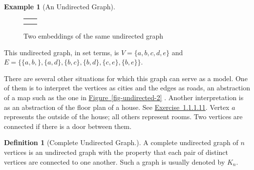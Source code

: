 \documentclass[10pt,]{book}
\theoremstyle{plain}
\theoremstyle{definition}
\newtheorem{definition}[theorem]{Definition}
\theoremstyle{definition}
\theoremstyle{definition}
\newtheorem{example}[theorem]{Example}
\theoremstyle{definition}
\theoremstyle{definition}
\numberwithin{equation}{section}
\newlength{\panelmax}
\begin{document}
\begin{example}[An Undirected Graph]
{\settototalheight{\phDimage}{\usebox{\panelboxDimage}}
\setlength{\panelmax}{\maxof{\panelmax}{\phDimage}}
\leavevmode%
\setlength{\tabcolsep}{0\textwidth}
\begin{figure}
\begin{tabular}{@{}*{2}{c}@{}}
\begin{minipage}[c][\panelmax][t]{0.5\textwidth}\usebox{\panelboxCimage}\end{minipage}&
\begin{minipage}[c][\panelmax][t]{0.5\textwidth}\usebox{\panelboxDimage}\end{minipage}\tabularnewline
\parbox[t]{0.5\textwidth}{\subcaption{\label{fig-undirected-1}}
}&
\parbox[t]{0.5\textwidth}{\subcaption{\label{fig-undirected-2}}
}\end{tabular}
\caption{Two embeddings of the same undirected graph\label{fig-sidebyside-9-1}}
\end{figure}
}%
\par
This undirected graph, in set terms,  is \(V = \{a, b, c, d, e\}\) and \(E = \{\{a, b,\}, \{a, d\}, \{b, c\}, \{b, d\}, \{c, e\}, \{b, e\}\}\).%
\par
There are several other situations for which this graph can serve as a model. One of them is to interpret the vertices as cities and the edges as roads, an abstraction of a map such as the one in \hyperref[fig-undirected-2]{Figure~\ref{fig-undirected-2}} . Another interpretation is as an abstraction of the floor plan of a house.  See \hyperlink{exercise-house-9-1}{Exercise~1.1.1.11}. Vertex \(a\) represents the outside of the house; all others represent rooms. Two vertices are connected if there is a door between
them. %
\end{example}
\begin{definition}[Complete Undirected Graph.]\label{def-complete-undirected-graph}
\label{notation-2}
A complete undirected graph of \(n\) vertices is an undirected graph with the property that each pair of distinct vertices are connected to one another. Such a graph is usually denoted by \(K_n\).%
\end{definition}
\end{document}

